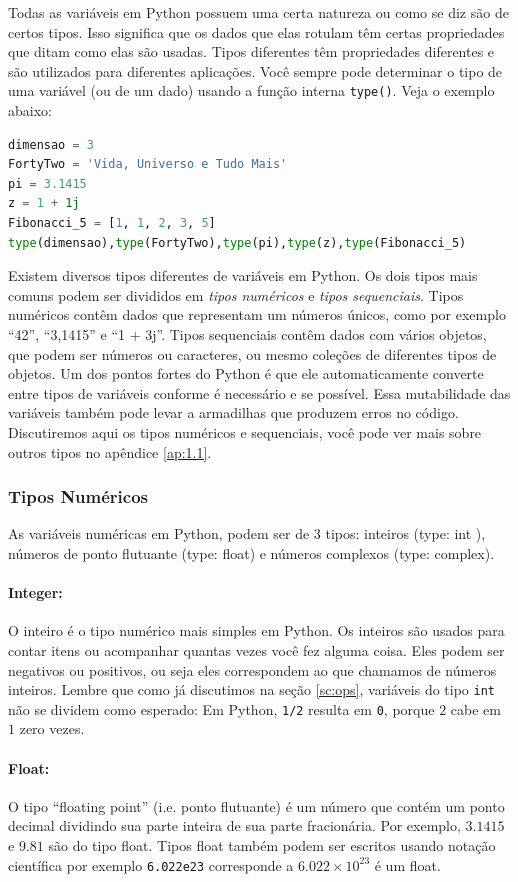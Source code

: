 Todas as variáveis em Python possuem uma certa natureza ou como se diz são de certos tipos. Isso significa que os dados que elas rotulam têm certas propriedades que ditam como elas são usadas. Tipos diferentes têm propriedades diferentes e são utilizados para diferentes aplicações. Você sempre pode determinar o tipo de uma variável (ou de um dado) usando a função interna {\tt type()}. Veja o exemplo abaixo:
\begin{lstlisting}[language=Python]
dimensao = 3
FortyTwo = 'Vida, Universo e Tudo Mais'
pi = 3.1415
z = 1 + 1j
Fibonacci_5 = [1, 1, 2, 3, 5]
type(dimensao),type(FortyTwo),type(pi),type(z),type(Fibonacci_5)
\end{lstlisting}

Existem diversos tipos diferentes de variáveis em Python. Os dois tipos mais comuns 
podem ser divididos em {\it tipos numéricos} e {\it tipos sequenciais}. Tipos numéricos
contêm dados que representam um números únicos, como por exemplo ``42'', ``3,1415'' e ``1 + 3j''. Tipos sequenciais contêm dados com vários objetos, que podem ser números ou
caracteres, ou mesmo coleções de diferentes tipos de objetos. Um dos pontos fortes do Python é que ele automaticamente converte entre tipos de variáveis conforme é necessário e se possível. Essa mutabilidade das variáveis também pode levar a armadilhas que produzem erros no código. Discutiremos aqui os tipos numéricos e sequenciais, você pode ver mais sobre outros tipos no apêndice \ref{ap:1.1}.

\subsubsection{Tipos Numéricos}
As variáveis numéricas em Python, podem ser de 3 tipos: inteiros (type: int ), números de ponto flutuante (type: float) e números complexos (type: complex).

\paragraph{Integer:} O inteiro é o tipo numérico mais simples em Python. Os inteiros são
usados para contar itens ou acompanhar quantas vezes você fez alguma coisa. Eles podem ser negativos ou positivos, ou seja eles correspondem ao que chamamos de números inteiros. Lembre que como já discutimos na seção \ref{sc:ops}, variáveis do tipo {\tt int} não se dividem como esperado: Em Python, {\tt 1/2} resulta em {\tt 0}, porque $2$ cabe em $1$ zero vezes.
\paragraph{Float:} O tipo “floating point” (i.e. ponto flutuante) é um número que contém um ponto decimal dividindo sua parte inteira de sua parte fracionária. Por exemplo, $3.1415$ e $9.81$ são do tipo float. Tipos float também podem ser escritos usando notação científica por exemplo {\tt 6.022e23} corresponde a $6.022 \times 10^{23}$ é um float. 
